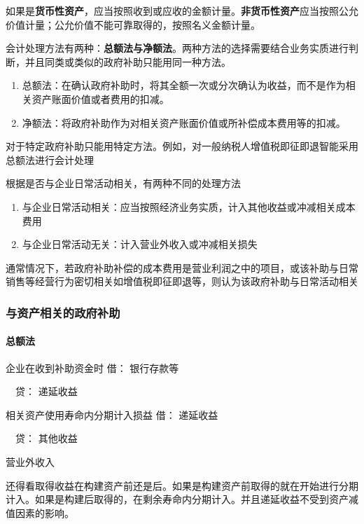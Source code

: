 \documentclass[UTF8,12pt]{ctexart}
\newenvironment{Dr}{\noindent 借：}{\par}
\newenvironment{Cr}{\noindent \ \ 贷：}{\par}
\numberwithin{equation}{section} %
\numberwithin{figure}{section}
\numberwithin{table}{section}
\begin{document}
	如果是\textbf{货币性资产}，应当按照收到或应收的金额计量。\textbf{非货币性资产}应当按照公允价值计量；公允价值不能可靠取得的，按照名义金额计量。
	
	会计处理方法有两种：\textbf{总额法与净额法}。两种方法的选择需要结合业务实质进行判断，并且同类或类似的政府补助只能用同一种方法。
	\begin{enumerate}
		\item 总额法：在确认政府补助时，将其全额一次或分次确认为收益，而不是作为相关资产账面价值或者费用的扣减。
		
		\item 净额法：将政府补助作为对相关资产账面价值或所补偿成本费用等的扣减。
	\end{enumerate}
	
	对于特定政府补助只能用特定方法。例如，对一般纳税人增值税即征即退智能采用总额法进行会计处理
	
	根据是否与企业日常活动相关，有两种不同的处理方法
	\begin{enumerate}
		\item 与企业日常活动相关：应当按照经济业务实质，计入其他收益或冲减相关成本费用
		
		\item 与企业日常活动无关：计入营业外收入或冲减相关损失
	\end{enumerate}
	通常情况下，若政府补助补偿的成本费用是营业利润之中的项目，或该补助与日常销售等经营行为密切相关如增值税即征即退等，则认为该政府补助与日常活动相关
	
	\subsubsection{与资产相关的政府补助}
	\paragraph{总额法}
	
	企业在收到补助资金时
	\begin{Dr}
		银行存款等
	\end{Dr}
	\begin{Cr}
		递延收益
	\end{Cr}

	相关资产使用寿命内分期计入损益
	\begin{Dr}
		递延收益
	\end{Dr}
	\begin{Cr}
		其他收益
		
		营业外收入
	\end{Cr}
	
	还得看取得收益在构建资产前还是后。如果是构建资产前取得的就在开始进行分期计入。如果是构建后取得的，在剩余寿命内分期计入。并且递延收益不受到资产减值因素的影响。
	
\end{document}
